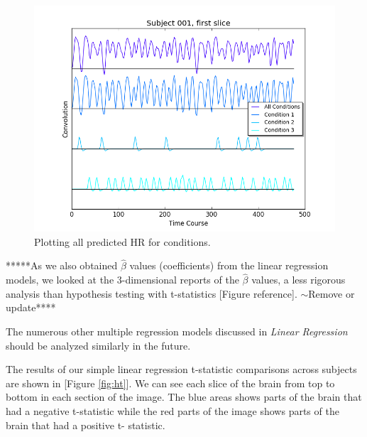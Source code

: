 \begin{figure}[ht]
\centering
\includegraphics[scale=.5]{../images/all_cond_time}  
\caption{Plotting all predicted HR for conditions.}
\label{fig:all_cond_time}
\end{figure}

*****As we also obtained $\hat{\beta}$ values (coefficients) from the linear 
regression models, we looked at the 3-dimensional reports of the 
$\hat{\beta}$ values, a less rigorous analysis than hypothesis testing with 
t-statistics [Figure reference]. $\sim$Remove or update****



The numerous other multiple regression models discussed in 
\textit{Linear Regression} should be analyzed similarly in the future. 



\par \indent The results of our simple linear regression t-statistic 
comparisons across subjects are shown in [Figure \ref{fig:ht}]. We can see 
each slice of the brain from top to bottom in each section of the image. The 
blue areas shows parts of the brain that had a negative t-statistic while the 
red parts of the image shows parts of the brain that had a positive t-
statistic.


